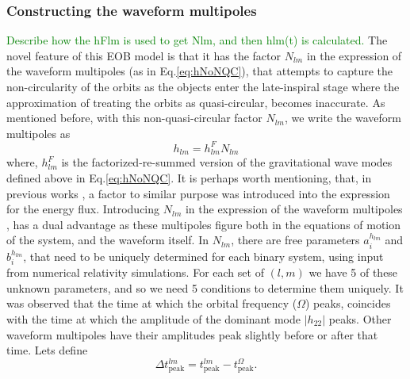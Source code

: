 \documentclass[aps,
prd,
amsmath,
amssymb,
twocolumn,
floatfix,
groupedaddress]{revtex4-1}
\newcommand{\ii}{{\rm i}}
\newcommand{\peak}{\mathrm{peak}}
\begin{document}
\subsubsection{Constructing the waveform multipoles}\label{sec:level3:hlm}
\textcolor{green}{Describe how the hFlm is used to get Nlm, and then hlm(t) is calculated.}
The novel feature of this EOB model is that it has the factor $N_{lm}$ in the expression of the waveform multipoles (as in Eq.\eqref{eq:hNoNQC}), that attempts to capture the non-circularity of the orbits as the objects enter the late-inspiral stage where the approximation of treating the orbits as quasi-circular, becomes inaccurate. As mentioned before, with this non-quasi-circular factor $N_{lm}$, we write the waveform multipoles as
\begin{equation}
h_{lm} = h^F_{lm} N_{lm}
\end{equation}
where, $h^F_{lm}$ is the factorized-re-summed version of the gravitational wave modes defined above in Eq.\eqref{eq:hNoNQC}. It is perhaps worth mentioning, that, in previous works \citep{EOBdevel02,EOBNRdevel04}, a factor to similar purpose was introduced into the expression for the energy flux. Introducing $N_{lm}$ in the expression of the waveform multipoles \citep{DamourNQC01,BuonannoEOBv2Main}, has a dual advantage as these multipoles figure both in the equations of motion of the system, and the waveform itself.
In $N_{lm}$, there are free parameters $a_i^{h_{lm}}$ and $b_i^{h_{lm}}$, that need to be uniquely determined for each binary system, using input from numerical relativity simulations. For each set of $(l,m)$ we have 5 of these unknown parameters, and so we need 5 conditions to determine them uniquely. It was observed \citep{BuonannoEOBv2Main} that the time at which the orbital frequency ($\Omega$) peaks, coincides with the time at which the amplitude of the dominant mode $|h_{22}|$ peaks. Other waveform multipoles have their amplitudes peak slightly before or after that time. Lets define
\begin{equation}
\Delta t^{lm}_{\peak} = t^{lm}_{\peak} - t^{\Omega}_{\peak}.
\end{equation}
\end{document}
